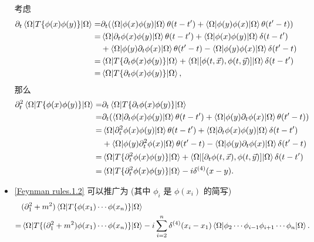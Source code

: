 \begin{itemize}
	\begin{tcolorbox}[title=proof:]
		考虑
		\begin{align}
			\partial_t \braket{\Omega | T\{\phi(x) \phi(y)\} | \Omega} =& \partial_t (\braket{\Omega | \phi(x) \phi(y) | \Omega} \theta(t - t') + \braket{\Omega | \phi(y) \phi(x) | \Omega} \theta(t' - t)) \notag \\
			=& \braket{\Omega | \partial_t \phi(x) \phi(y) | \Omega} \theta(t - t') + \braket{\Omega | \phi(x) \phi(y) | \Omega} \delta(t - t') \notag \\
			& + \braket{\Omega | \phi(y) \partial_t \phi(x) | \Omega} \theta(t' - t) - \braket{\Omega | \phi(y) \phi(x) | \Omega} \delta(t' - t) \notag \\
			=& \braket{\Omega | T \{\partial_t \phi(x) \phi(y)\} | \Omega} + \braket{\Omega | [\phi(t, \vec{x}), \phi(t, \vec{y})] | \Omega} \delta(t - t') \notag \\
			=& \braket{\Omega | T \{\partial_t \phi(x) \phi(y)\} | \Omega},
		\end{align}
		那么
		\begin{align}
			\partial_t^2 \braket{\Omega | T\{\phi(x) \phi(y)\} | \Omega} =& \partial_t \braket{\Omega | T \{\partial_t \phi(x) \phi(y)\} | \Omega} \notag \\
			=& \partial_t (\braket{\Omega | \partial_t \phi(x) \phi(y) | \Omega} \theta(t - t') + \braket{\Omega | \phi(y) \partial_t \phi(x) | \Omega} \theta(t' - t)) \notag \\
			=& \braket{\Omega | \partial_t^2 \phi(x) \phi(y) | \Omega} \theta(t - t') + \braket{\Omega | \partial_t \phi(x) \phi(y) | \Omega} \delta(t - t') \notag \\
			& + \braket{\Omega | \phi(y) \partial_t^2 \phi(x) | \Omega} \theta(t' - t) - \braket{\Omega | \phi(y) \partial_t \phi(x) | \Omega} \delta(t' - t) \notag \\
			=& \braket{\Omega | T \{\partial_t^2 \phi(x) \phi(y)\} | \Omega} + \braket{\Omega | [\partial_t \phi(t, \vec{x}), \phi(t, \vec{y})] | \Omega} \delta(t - t') \notag \\
			=& \braket{\Omega | T \{\partial_t^2 \phi(x) \phi(y)\} | \Omega} - i \delta^{(4)}(x - y).
		\end{align}
	\end{tcolorbox}
	
	\item \eqref{Feynman rules.1.2} 可以推广为 (其中 $\phi_i$ 是 $\phi(x_i)$ 的简写)
	\begin{align}
		& (\partial_1^2 + m^2) \braket{\Omega | T\{\phi(x_1) \cdots \phi(x_n)\} | \Omega} \notag \\
		=& \braket{\Omega | T\{(\partial_1^2 + m^2) \phi(x_1) \cdots \phi(x_n)\} | \Omega} - i \sum_{i = 2}^n \delta^{(4)}(x_i - x_1) \braket{\Omega | \phi_2 \cdots \phi_{i - 1} \phi_{i + 1} \cdots \phi_n | \Omega}. \label{Feynman rules.1.5}
	\end{align}
	

\end{itemize}
